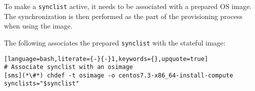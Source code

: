To make a \texttt{synclist} active, it needs to be associated with a prepared OS
image. The synchronization is then performed as the part of the provisioning
process when using the image.


The following associates the prepared \texttt{synclist} with the stateful \xCAT{} image:

\begin{lstlisting}[language=bash,literate={-}{-}1,keywords={},upquote=true]
# Associate synclist with an osimage
[sms](*\#*) chdef -t osimage -o centos7.3-x86_64-install-compute synclists="$synclist"
\end{lstlisting}
